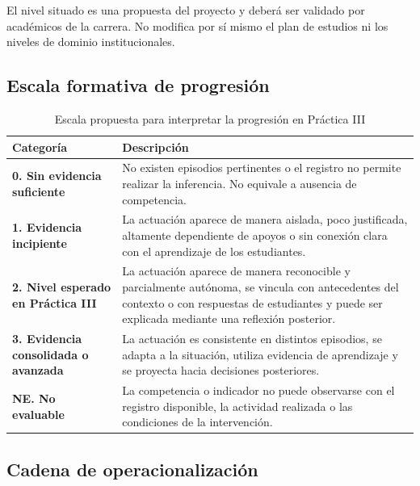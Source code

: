 \documentclass[11pt,a4paper]{article}
\begin{document}
El nivel situado es una propuesta del proyecto y deberá ser validado por académicos de la carrera. No modifica por sí mismo el plan de estudios ni los niveles de dominio institucionales.

\subsection{Escala formativa de progresión}

\begin{table}[ht]
\centering
\caption{Escala propuesta para interpretar la progresión en Práctica III}
\begin{tabularx}{\textwidth}{>{\bfseries}p{2cm}X}
\toprule
Categoría & Descripción\\
\midrule
0. Sin evidencia suficiente &
No existen episodios pertinentes o el registro no permite realizar la inferencia. No equivale a ausencia de competencia.\\
1. Evidencia incipiente &
La actuación aparece de manera aislada, poco justificada, altamente dependiente de apoyos o sin conexión clara con el aprendizaje de los estudiantes.\\
2. Nivel esperado en Práctica III &
La actuación aparece de manera reconocible y parcialmente autónoma, se vincula con antecedentes del contexto o con respuestas de estudiantes y puede ser explicada mediante una reflexión posterior.\\
3. Evidencia consolidada o avanzada &
La actuación es consistente en distintos episodios, se adapta a la situación, utiliza evidencia de aprendizaje y se proyecta hacia decisiones posteriores.\\
NE. No evaluable &
La competencia o indicador no puede observarse con el registro disponible, la actividad realizada o las condiciones de la intervención.\\
\bottomrule
\end{tabularx}
\end{table}

\subsection{Cadena de operacionalización}
\end{document}
